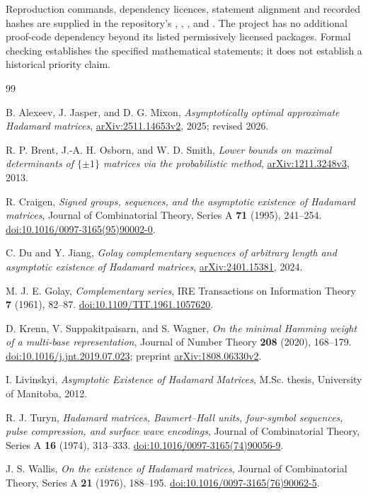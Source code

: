 \documentclass[11pt]{article}
\begin{document}
Reproduction commands, dependency licences, statement alignment and
recorded hashes are supplied in the repository's ,
, , and
. The project has no additional
proof-code dependency beyond its listed permissively licensed packages.
Formal checking establishes the specified mathematical statements; it
does not establish a historical priority claim.

\begin{thebibliography}{99}
\raggedright

B. Alexeev, J. Jasper, and D. G. Mixon,
\emph{Asymptotically optimal approximate Hadamard matrices},
\href{https://arxiv.org/abs/2511.14653v2}{arXiv:2511.14653v2}, 2025; revised 2026.

R. P. Brent, J.-A. H. Osborn, and W. D. Smith,
\emph{Lower bounds on maximal determinants of $\{\pm1\}$ matrices via the probabilistic method},
\href{https://arxiv.org/abs/1211.3248v3}{arXiv:1211.3248v3}, 2013.


R. Craigen,
\emph{Signed groups, sequences, and the asymptotic existence of Hadamard matrices},
Journal of Combinatorial Theory, Series A \textbf{71} (1995), 241--254.
\href{https://doi.org/10.1016/0097-3165(95)90002-0}{doi:10.1016/0097-3165(95)90002-0}.

C. Du and Y. Jiang,
\emph{Golay complementary sequences of arbitrary length and asymptotic existence of Hadamard matrices},
\href{https://arxiv.org/abs/2401.15381}{arXiv:2401.15381}, 2024.

M. J. E. Golay,
\emph{Complementary series},
IRE Transactions on Information Theory \textbf{7} (1961), 82--87.
\href{https://doi.org/10.1109/TIT.1961.1057620}{doi:10.1109/TIT.1961.1057620}.

D. Krenn, V. Suppakitpaisarn, and S. Wagner,
\emph{On the minimal Hamming weight of a multi-base representation},
Journal of Number Theory \textbf{208} (2020), 168--179.
\href{https://doi.org/10.1016/j.jnt.2019.07.023}{doi:10.1016/j.jnt.2019.07.023}; preprint \href{https://arxiv.org/abs/1808.06330v2}{arXiv:1808.06330v2}.

I. Livinskyi,
\emph{Asymptotic Existence of Hadamard Matrices},
M.Sc. thesis, University of Manitoba, 2012.

R. J. Turyn,
\emph{Hadamard matrices, Baumert--Hall units, four-symbol sequences, pulse compression, and surface wave encodings},
Journal of Combinatorial Theory, Series A \textbf{16} (1974), 313--333.
\href{https://doi.org/10.1016/0097-3165(74)90056-9}{doi:10.1016/0097-3165(74)90056-9}.

J. S. Wallis,
\emph{On the existence of Hadamard matrices},
Journal of Combinatorial Theory, Series A \textbf{21} (1976), 188--195.
\href{https://doi.org/10.1016/0097-3165(76)90062-5}{doi:10.1016/0097-3165(76)90062-5}.

\end{thebibliography}
\end{document}

